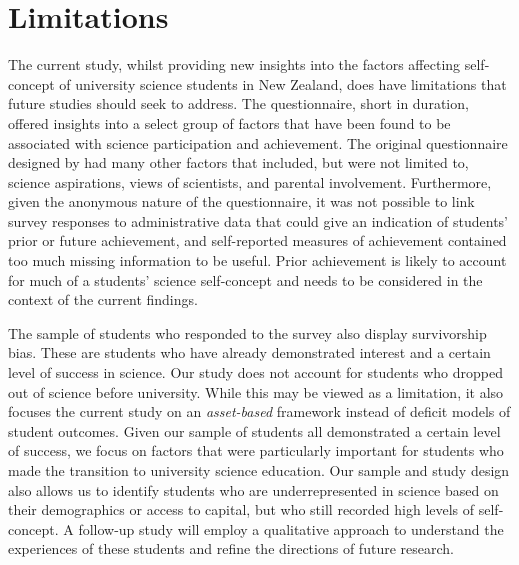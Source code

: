 \section*{Limitations}
The current study, whilst providing new insights into the factors affecting self-concept of university science students in New Zealand, does have limitations that future studies should seek to address. The questionnaire, short in duration, offered insights into a select group of factors that have been found to be associated with science participation and achievement. The original questionnaire designed by \cite{dewitt2011high} had many other factors that included, but were not limited to, science aspirations, views of scientists, and parental involvement. Furthermore, given the anonymous nature of the questionnaire, it was not possible to link survey responses to administrative data that could give an indication of students' prior or future achievement, and self-reported measures of achievement contained too much missing information to be useful. Prior achievement is likely to account for much of a students' science self-concept and needs to be considered in the context of the current findings.

The sample of students who responded to the survey also display survivorship bias. These are students who have already demonstrated interest and a certain level of success in science. Our study does not account for students who dropped out of science before university. While this may be viewed as a limitation, it also focuses the current study on an \textit{asset-based} framework instead of deficit models of student outcomes. Given our sample of students all demonstrated a certain level of success, we focus on factors that were particularly important for students who made the transition to university science education. Our sample and study design also allows us to identify students who are underrepresented in science based on their demographics or access to capital, but who still recorded high levels of self-concept. A follow-up study will employ a qualitative approach to understand the experiences of these students and refine the directions of future research.

